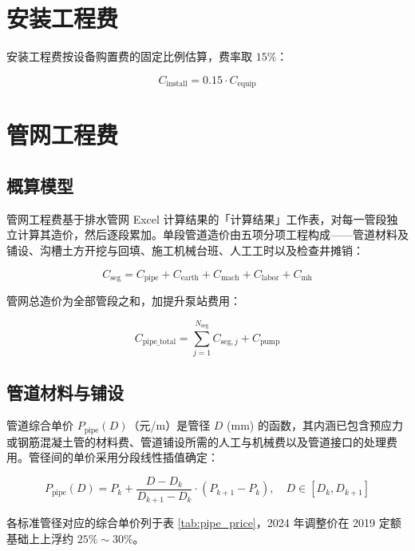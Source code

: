 \documentclass[12pt,a4paper]{ctexart}
\begin{document}
\section{安装工程费}

安装工程费按设备购置费的固定比例估算，费率取 $15\%$：

\begin{equation}
C_{\text{install}} = 0.15 \cdot C_{\text{equip}}
\end{equation}

\section{管网工程费}

\subsection{概算模型}

管网工程费基于排水管网 Excel 计算结果的「计算结果」工作表，对每一管段独立计算其造价，然后逐段累加。单段管道造价由五项分项工程构成——管道材料及铺设、沟槽土方开挖与回填、施工机械台班、人工工时以及检查井摊销：

\begin{equation}
C_{\text{seg}} = C_{\text{pipe}} + C_{\text{earth}} + C_{\text{mach}} + C_{\text{labor}} + C_{\text{mh}}
\end{equation}

管网总造价为全部管段之和，加提升泵站费用：

\begin{equation}
C_{\text{pipe\_total}} = \sum_{j=1}^{N_{\text{seg}}} C_{\text{seg},j} + C_{\text{pump}}
\end{equation}

\subsection{管道材料与铺设}

管道综合单价 $P_{\text{pipe}}(D)$（元/m）是管径 $D$ (mm) 的函数，其内涵已包含预应力或钢筋混凝土管的材料费、管道铺设所需的人工与机械费以及管道接口的处理费用。管径间的单价采用分段线性插值确定：

\begin{equation}
P_{\text{pipe}}(D) = P_k + \frac{D - D_k}{D_{k+1} - D_k} \cdot (P_{k+1} - P_k),\quad D \in [D_k, D_{k+1}]
\end{equation}

各标准管径对应的综合单价列于表 \ref{tab:pipe_price}，2024 年调整价在 2019 定额基础上上浮约 $25\%\sim30\%$。
\end{document}
